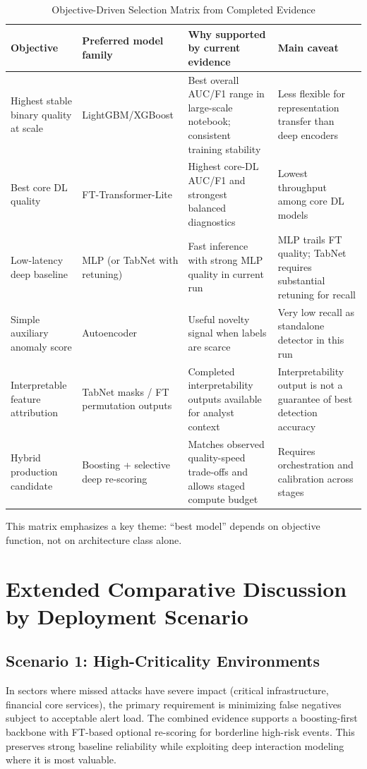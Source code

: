 \documentclass[10pt,journal]{IEEEtran}
\begin{document}
\begin{table}[!t]
\caption{Objective-Driven Selection Matrix from Completed Evidence}
\label{tab:selection_matrix}
\centering
\begin{tabular}{p{3.0cm}p{2.5cm}p{4.2cm}p{5.0cm}}
\toprule
Objective & Preferred model family & Why supported by current evidence & Main caveat \\
\midrule
Highest stable binary quality at scale & LightGBM/XGBoost & Best overall AUC/F1 range in large-scale notebook; consistent training stability & Less flexible for representation transfer than deep encoders \\
Best core DL quality & FT-Transformer-Lite & Highest core-DL AUC/F1 and strongest balanced diagnostics & Lowest throughput among core DL models \\
Low-latency deep baseline & MLP (or TabNet with retuning) & Fast inference with strong MLP quality in current run & MLP trails FT quality; TabNet requires substantial retuning for recall \\
Simple auxiliary anomaly score & Autoencoder & Useful novelty signal when labels are scarce & Very low recall as standalone detector in this run \\
Interpretable feature attribution & TabNet masks / FT permutation outputs & Completed interpretability outputs available for analyst context & Interpretability output is not a guarantee of best detection accuracy \\
Hybrid production candidate & Boosting + selective deep re-scoring & Matches observed quality-speed trade-offs and allows staged compute budget & Requires orchestration and calibration across stages \\
\bottomrule
\end{tabular}
\end{table}

This matrix emphasizes a key theme: ``best model'' depends on objective function, not on architecture class alone.

\section{Extended Comparative Discussion by Deployment Scenario}
\subsection{Scenario 1: High-Criticality Environments}
In sectors where missed attacks have severe impact (critical infrastructure, financial core services), the primary requirement is minimizing false negatives subject to acceptable alert load. The combined evidence supports a boosting-first backbone with FT-based optional re-scoring for borderline high-risk events. This preserves strong baseline reliability while exploiting deep interaction modeling where it is most valuable.
\end{document}
